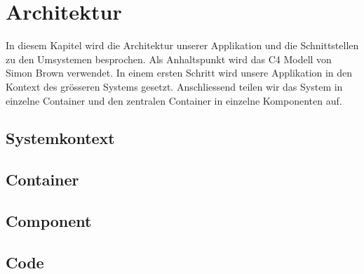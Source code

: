 
\section{Architektur}
\label{Architektur}

In diesem Kapitel wird die Architektur unserer Applikation und die Schnittstellen zu den Umsystemen besprochen. Als Anhaltspunkt wird das C4 Modell \cite{c4model} von Simon Brown verwendet. In einem ersten Schritt wird unsere Applikation in den Kontext des grösseren Systems gesetzt. Anschliessend teilen wir das System  in einzelne Container und den zentralen Container  in einzelne Komponenten auf.

\subsection{Systemkontext}
\label{Architektur:Systemkontext}


\subsection{Container}
\label{Architektur:Container}



\subsection{Component}
\label{Architektur:Component}


\subsection{Code}
\label{Architektur:Code}


